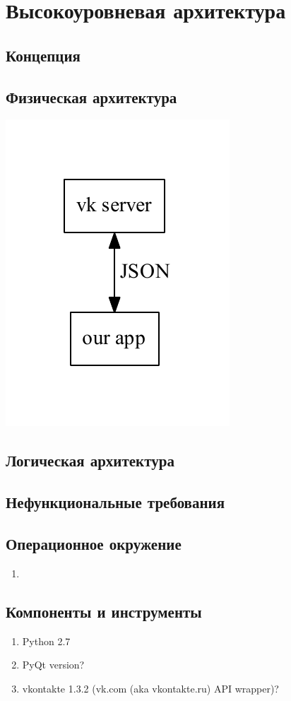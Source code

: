 \documentclass[12pt]{article}
\begin{document}
\section*{Высокоуровневая архитектура}

\subsection*{Концепция}

\subsection*{Физическая архитектура}
\includegraphics{./diag/phys.pdf}

\subsection*{Логическая архитектура}

\subsection*{Нефункциональные требования}

\subsection*{Операционное окружение}
% 
\begin{enumerate}
\item
\end{enumerate}

\subsection*{Компоненты и инструменты}
% 
\begin{enumerate}
\item Python 2.7
\item PyQt version?
\item vkontakte 1.3.2 (vk.com (aka vkontakte.ru) API wrapper)?
\end{enumerate}
\end{document}
